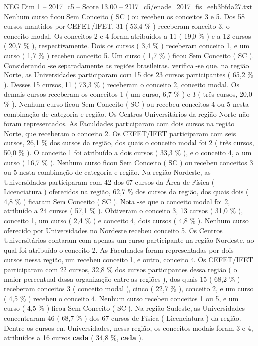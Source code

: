\begin{textsample}{NEG Dim 1 – 2017\_c5 – Score 13.00 – 2017\_c5/enade\_2017\_fis\_eeb3bfda27.txt}
Nenhum curso ficou Sem Conceito ( SC ) ou recebeu os conceitos 3 e 5.
Dos 58 cursos mantidos por CEFET/IFET, 31 ( 53,4 \% ) receberam conceito 3, o conceito modal.
Os conceitos 2 e 4 foram atribuídos a 11 ( 19,0 \% ) e a 12 cursos ( 20,7 \% ), respectivamente.
Dois os cursos ( 3,4 \% ) receberam conceito 1, e um curso ( 1,7 \% ) recebeu conceito 5.
Um curso ( 1,7 \% ) ficou Sem Conceito ( SC ).
Considerando -se separadamente as regiões brasileiras, verifica -se que, na região Norte, as Universidades participaram com 15 dos 23 cursos participantes ( 65,2 \% ).
Desses 15 cursos, 11 ( 73,3 \% ) receberam o conceito 2, conceito modal.
Os demais cursos receberam os conceitos 1 ( um curso, 6,7 \% ) e 3 ( três cursos, 20,0 \% ).
Nenhum curso ficou Sem Conceito ( SC ) ou recebeu conceitos 4 ou 5 nesta combinação de categoria e região.
Os Centros Universitários da região Norte não foram representados.
As Faculdades participaram com dois cursos na região Norte, que receberam o conceito 2.
Os CEFET/IFET participaram com seis cursos, 26,1 \% dos cursos da região, dos quais o conceito modal foi 2 ( três cursos, 50,0 \% ).
O conceito 1 foi atribuído a dois cursos ( 33,3 \% ), e o conceito 4, a um curso ( 16,7 \% ).
Nenhum curso ficou Sem Conceito ( SC ) ou recebeu conceitos 3 ou 5 nesta combinação de categoria e região.
Na região Nordeste, as Universidades participaram com 42 dos 67 cursos da Área de Física ( Licenciatura ) oferecidos na região, 62,7 \% dos cursos da região, dos quais dois ( 4,8 \% ) ficaram Sem Conceito ( SC ).
Nota -se que o conceito modal foi 2, atribuído a 24 cursos ( 57,1 \% ).
Obtiveram o conceito 3, 13 cursos ( 31,0 \% ), conceito 1, um curso ( 2,4 \% ) e conceito 4, dois cursos ( 4,8 \% ).
Nenhum curso oferecido por Universidades no Nordeste recebeu conceito 5.
Os Centros Universitários contaram com apenas um curso participante na região Nordeste, ao qual foi atribuído o conceito 2.
As Faculdades foram representadas por dois cursos nessa região, um recebeu conceito 1, e outro, conceito 4.
Os CEFET/IFET participaram com 22 cursos, 32,8 \% dos cursos participantes dessa região ( o maior percentual dessa organização entre as regiões ), dos quais 15 ( 68,2 \% ) receberam conceitos 3 ( conceito modal ), cinco ( 22,7 \% ), conceito 2, e um curso ( 4,5 \% ) recebeu o conceito 4.
Nenhum curso recebeu conceitos 1 ou 5, e um curso ( 4,5 \% ) ficou Sem Conceito ( SC ).
Na região Sudeste, as Universidades concentraram 46 ( 68,7 \% ) dos 67 cursos de Física ( Licenciatura ) da região.
Dentre os cursos em Universidades, nessa região, os conceitos modais foram 3 e 4, atribuídos a 16 cursos \textbf{cada} ( 34,8 \%, \textbf{cada} ).

\end{textsample}
